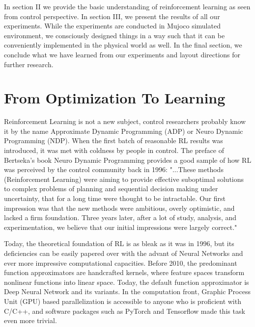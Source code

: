 \documentclass[journal]{IEEEtran}
\begin{document}
In section II we provide the basic understanding of reinforcement learning as seen from control perspective. In section III, we present the results of all our experiments. While the experiments are conducted in Mujoco simulated environment, we consciously designed things in a way such that it can be conveniently implemented in the physical world as well. In the final section, we conclude what we have learned from our experiments and layout directions for further research.



\section{From Optimization To Learning}

Reinforcement Learning is not a new subject, control researchers probably know it by the name Approximate Dynamic Programming (ADP) or Neuro Dynamic Programming (NDP). When the first batch of reasonable RL results was introduced, it was met with coldness by people in control. The preface of Bertseka's book Neuro Dynamic Programming provides a good sample of how RL was perceived by the control community back in 1996: "...These methods (Reinforcement Learning) were aiming to provide effective suboptimal solutions to complex problems of planning and sequential decision making under uncertainty, that for a long time were thought to be intractable. Our first impression was that the new methods were ambitious, overly optimistic, and lacked a firm foundation. Three years later, after a lot of study, analysis, and experimentation, we believe that our initial impressions were largely correct." \cite{Bertsekas1996NeuroDynamicP}

Today, the theoretical foundation of RL is as bleak as it was in 1996, but its deficiencies can be easily papered over with the advant of Neural Networks and ever more impressive computational capacities. Before 2010, the predominant function approximators are handcrafted kernels, where feature spaces transform nonlinear functions into linear space. Today, the default function approximator is Deep Neural Network and its variants. In the computation front, Graphic Process Unit (GPU) based parallelization is accessible to anyone who is proficient with C/C++\cite{Nickolls2008ScalablePP}, and software packages such as PyTorch\cite{Paszke2017AutomaticDI} and Tensorflow\cite{Abadi2016TensorFlowAS} made this task even more trivial.
\end{document}
